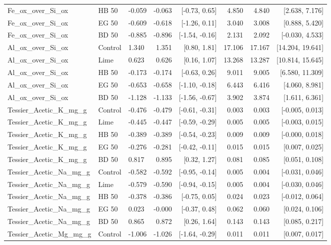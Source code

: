\documentclass[preprint,12pt]{elsarticle}
\begin{document}
\begin{landscape}
\begin{longtable}{lllrrrrr}
Fe\_ox\_over\_Si\_ox & HB 50 & -0.059 & -0.063 & [-0.73, 0.65] & 4.850 & 4.840 & [2.638, 7.176] \\
Fe\_ox\_over\_Si\_ox & EG 50 & -0.609 & -0.618 & [-1.26, 0.11] & 3.040 & 3.008 & [0.888, 5.420] \\
Fe\_ox\_over\_Si\_ox & BD 50 & -0.885 & -0.896 & [-1.54, -0.16] & 2.131 & 2.092 & [-0.030, 4.533] \\
Al\_ox\_over\_Si\_ox & Control & 1.340 & 1.351 & [0.80, 1.81] & 17.106 & 17.167 & [14.204, 19.641] \\
Al\_ox\_over\_Si\_ox & Lime & 0.623 & 0.626 & [0.16, 1.07] & 13.268 & 13.287 & [10.814, 15.645] \\
Al\_ox\_over\_Si\_ox & HB 50 & -0.173 & -0.174 & [-0.63, 0.26] & 9.011 & 9.005 & [6.580, 11.309] \\
Al\_ox\_over\_Si\_ox & EG 50 & -0.653 & -0.658 & [-1.10, -0.18] & 6.443 & 6.416 & [4.060, 8.981] \\
Al\_ox\_over\_Si\_ox & BD 50 & -1.128 & -1.133 & [-1.56, -0.67] & 3.902 & 3.874 & [1.611, 6.361] \\
Tessier\_Acetic\_K\_mg\_g & Control & -0.476 & -0.479 & [-0.61, -0.31] & 0.003 & 0.003 & [-0.005, 0.013] \\
Tessier\_Acetic\_K\_mg\_g & Lime & -0.445 & -0.447 & [-0.59, -0.29] & 0.005 & 0.005 & [-0.003, 0.015] \\
Tessier\_Acetic\_K\_mg\_g & HB 50 & -0.389 & -0.389 & [-0.54, -0.23] & 0.009 & 0.009 & [-0.000, 0.018] \\
Tessier\_Acetic\_K\_mg\_g & EG 50 & -0.276 & -0.281 & [-0.42, -0.11] & 0.015 & 0.015 & [0.007, 0.025] \\
Tessier\_Acetic\_K\_mg\_g & BD 50 & 0.817 & 0.895 & [0.32, 1.27] & 0.081 & 0.085 & [0.051, 0.108] \\
Tessier\_Acetic\_Na\_mg\_g & Control & -0.582 & -0.592 & [-0.95, -0.14] & 0.005 & 0.004 & [-0.031, 0.046] \\
Tessier\_Acetic\_Na\_mg\_g & Lime & -0.579 & -0.590 & [-0.94, -0.15] & 0.005 & 0.004 & [-0.030, 0.046] \\
Tessier\_Acetic\_Na\_mg\_g & HB 50 & -0.378 & -0.386 & [-0.75, 0.05] & 0.024 & 0.023 & [-0.012, 0.064] \\
Tessier\_Acetic\_Na\_mg\_g & EG 50 & 0.023 & -0.000 & [-0.37, 0.48] & 0.062 & 0.060 & [0.024, 0.106] \\
Tessier\_Acetic\_Na\_mg\_g & BD 50 & 0.865 & 0.872 & [0.26, 1.64] & 0.143 & 0.143 & [0.085, 0.217] \\
Tessier\_Acetic\_Mg\_mg\_g & Control & -1.006 & -1.026 & [-1.64, -0.29] & 0.011 & 0.011 & [0.007, 0.017] \\

\end{longtable}
\end{landscape}
\end{document}

